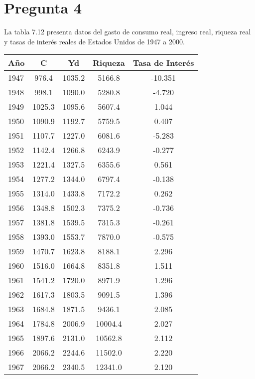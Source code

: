 \documentclass[10pt]{article}
\begin{document}
\section{Pregunta 4}
La tabla 7.12 presenta datos del gasto de consumo real, ingreso real, riqueza real y tasas de interés reales
de Estados Unidos de 1947 a 2000.
\begin{table}[H]
    \centering
    \tiny
    \begin{tabular}{lcccc}
        \hline
        \textbf{Año} & \textbf{C} & \textbf{Yd} & \textbf{Riqueza} & \textbf{Tasa de Interés} \\
        \hline
        1947 &  976.4 & 1035.2 &  5166.8 & -10.351 \\
        1948 &  998.1 & 1090.0 &  5280.8 &  -4.720 \\
        1949 & 1025.3 & 1095.6 &  5607.4 &   1.044 \\
        1950 & 1090.9 & 1192.7 &  5759.5 &   0.407 \\
        1951 & 1107.7 & 1227.0 &  6081.6 &  -5.283 \\
        1952 & 1142.4 & 1266.8 &  6243.9 &  -0.277 \\
        1953 & 1221.4 & 1327.5 &  6355.6 &   0.561 \\
        1954 & 1277.2 & 1344.0 &  6797.4 &  -0.138 \\
        1955 & 1314.0 & 1433.8 &  7172.2 &   0.262 \\
        1956 & 1348.8 & 1502.3 &  7375.2 &  -0.736 \\
        1957 & 1381.8 & 1539.5 &  7315.3 &  -0.261 \\
        1958 & 1393.0 & 1553.7 &  7870.0 &  -0.575 \\
        1959 & 1470.7 & 1623.8 &  8188.1 &   2.296 \\
        1960 & 1516.0 & 1664.8 &  8351.8 &   1.511 \\
        1961 & 1541.2 & 1720.0 &  8971.9 &   1.296 \\
        1962 & 1617.3 & 1803.5 &  9091.5 &   1.396 \\
        1963 & 1684.8 & 1871.5 &  9436.1 &   2.085 \\
        1964 & 1784.8 & 2006.9 & 10004.4 &   2.027 \\
        1965 & 1897.6 & 2131.0 & 10562.8 &   2.112 \\
        1966 & 2066.2 & 2244.6 & 11502.0 &   2.220 \\
        1967 & 2066.2 & 2340.5 & 12341.0 &   2.120 \\

\end{tabular}
\end{table}
\end{document}
